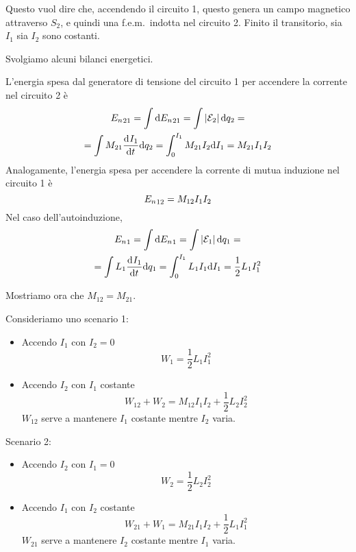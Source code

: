 Questo vuol dire che, accendendo il circuito 1, questo genera un campo magnetico attraverso $S_2$, e quindi una f.e.m.\ indotta nel circuito 2.
Finito il transitorio, sia $I_1$ sia $I_2$ sono costanti.

Svolgiamo alcuni bilanci energetici.

L'energia spesa dal generatore di tensione del circuito 1 per accendere la corrente nel circuito 2 è
\begin{equation}
\begin{gathered}
    \energy_{21}
    = \int \de \energy_{21}
    = \int \abs{\fem_2} \de q_2 = \\
    = \int M_{21} \der[I_1]{t} \de q_2
    = \int_0^{I_1} M_{21} I_2 \de I_1
    = M_{21} I_1 I_2
\end{gathered}
\end{equation}
Analogamente, l'energia spesa per accendere la corrente di mutua induzione nel circuito 1 è
\begin{equation}
    {E_n}_{12} = M_{12} I_1 I_2
\end{equation}
Nel caso dell'autoinduzione,
\begin{equation}
\begin{gathered}
    \energy_1
    = \int \de \energy_1
    = \int \abs{\fem_1} \de q_1 = \\
    = \int L_1 \der[I_1]{t} \de q_1
    = \int_0^{I_1} L_1 I_1 \de I_1
    = \frac{1}{2} L_1 I_1^2
\end{gathered}
\end{equation}

Mostriamo ora che $M_{12} = M_{21}$.

Consideriamo uno scenario 1:
\begin{itemize}
    \item Accendo $I_1$ con $I_2 = 0$
        \begin{equation}
            W_1 = \frac{1}{2} L_1 I_1^2
        \end{equation}
    \item Accendo $I_2$ con $I_1$ costante
        \begin{equation}
            W_{12} + W_2 = M_{12} I_1 I_2 + \frac{1}{2} L_2 I_2^2
        \end{equation}
        $W_{12}$ serve a mantenere $I_1$ costante mentre $I_2$ varia.
\end{itemize}

Scenario 2:
\begin{itemize}
    \item Accendo $I_2$ con $I_1 = 0$
        \begin{equation}
            W_2 = \frac{1}{2} L_2 I_2^2
        \end{equation}
    \item Accendo $I_1$ con $I_2$ costante
        \begin{equation}
            W_{21} + W_1 = M_{21} I_1 I_2 + \frac{1}{2} L_1 I_1^2
        \end{equation}
        $W_{21}$ serve a mantenere $I_2$ costante mentre $I_1$ varia.
\end{itemize}

